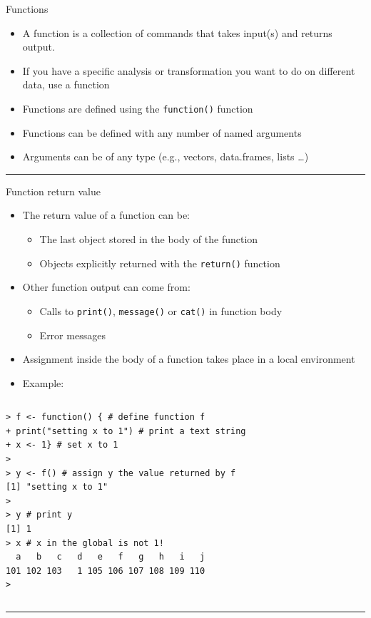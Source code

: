 \documentclass[table,smaller]{beamer}
\begin{document}
\begin{frame}[fragile,label=sec-5-1]{Functions}
 \begin{itemize}
\item A function is a collection of commands that takes input(s) and returns output.
\item If you have a specific analysis or transformation you want to do on different data, use a function
\item Functions are defined using the \verb~function()~ function
\item Functions can be defined with any number of named arguments
\item Arguments can be of any type (e.g., vectors, data.frames, lists \ldots{})
\end{itemize}

\rule{\linewidth}{0.5pt}
\end{frame}
\begin{frame}[fragile,label=sec-5-2]{Function return value}
 \begin{itemize}
\item The return value of a function can be:
\begin{itemize}
\item The last object stored in the body of the function
\item Objects explicitly returned with the \verb~return()~ function
\end{itemize}
\item Other function output can come from:
\begin{itemize}
\item Calls to \verb~print()~, \verb~message()~ or \verb~cat()~ in function body
\item Error messages
\end{itemize}
\item Assignment inside the body of a function takes place in a local environment
\item Example:
\end{itemize}

\vspace{-.5em}
\begin{columns}
\begin{block}{}
\begin{verbatim}
> f <- function() { # define function f
+ print("setting x to 1") # print a text string
+ x <- 1} # set x to 1
> 
> y <- f() # assign y the value returned by f
[1] "setting x to 1"
> 
> y # print y
[1] 1
> x # x in the global is not 1!
  a   b   c   d   e   f   g   h   i   j 
101 102 103   1 105 106 107 108 109 110 
>
\end{verbatim}
\end{block}
\end{columns}
\vspace{.5em}

\rule{\linewidth}{0.5pt}
\end{frame}
\end{document}
